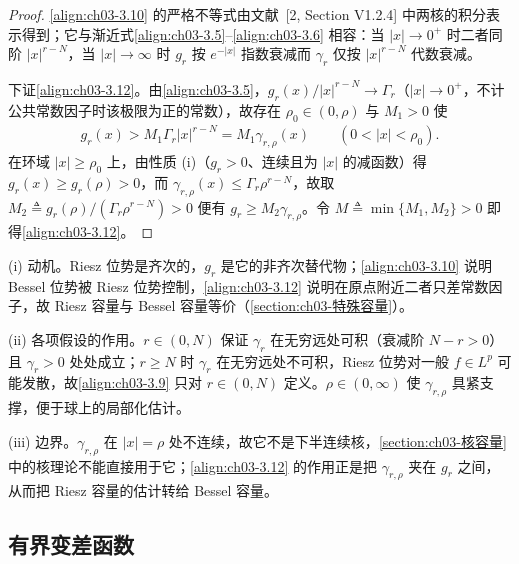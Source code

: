 \documentclass[../../main.tex]{subfiles}%
\begin{document}
\begin{proof}
\eqref{align:ch03-3.10} 的严格不等式由文献~[2, Section V1.2.4] 中两核的积分表示得到；它与渐近式\eqref{align:ch03-3.5}--\eqref{align:ch03-3.6} 相容：当 $|x|\to0^+$ 时二者同阶 $|x|^{r-N}$，当 $|x|\to\infty$ 时 $g_r$ 按 $e^{-|x|}$ 指数衰减而 $\gamma_r$ 仅按 $|x|^{r-N}$ 代数衰减。

下证\eqref{align:ch03-3.12}。由\eqref{align:ch03-3.5}，$g_r(x)/|x|^{r-N}\to\Gamma_r$（$|x|\to0^+$，不计公共常数因子时该极限为正的常数），故存在 $\rho_0\in(0,\rho)$ 与 $M_1>0$ 使
\begin{align*}
g_r(x)>M_1\Gamma_r|x|^{r-N}=M_1\gamma_{r,\rho}(x)\qquad(0<|x|<\rho_0).
\end{align*}
在环域 $|x|\geqslant\rho_0$ 上，由性质 (i)（$g_r>0$、连续且为 $|x|$ 的减函数）得 $g_r(x)\geqslant g_r(\rho)>0$，而 $\gamma_{r,\rho}(x)\leqslant\Gamma_r\rho^{r-N}$，故取 $M_2\triangleq g_r(\rho)/(\Gamma_r\rho^{r-N})>0$ 便有 $g_r\geqslant M_2\gamma_{r,\rho}$。令 $M\triangleq\min\{M_1,M_2\}>0$ 即得\eqref{align:ch03-3.12}。
\end{proof}

\begin{remark}\label{remark:ch03-Riesz核动机}
(i) 动机。Riesz 位势是齐次的，$g_r$ 是它的非齐次替代物；\eqref{align:ch03-3.10} 说明 Bessel 位势被 Riesz 位势控制，\eqref{align:ch03-3.12} 说明在原点附近二者只差常数因子，故 Riesz 容量与 Bessel 容量等价（\cref{section:ch03-特殊容量}）。

(ii) 各项假设的作用。$r\in(0,N)$ 保证 $\gamma_r$ 在无穷远处可积（衰减阶 $N-r>0$）且 $\gamma_r>0$ 处处成立；$r\geqslant N$ 时 $\gamma_r$ 在无穷远处不可积，Riesz 位势对一般 $f\in L^p$ 可能发散，故\eqref{align:ch03-3.9} 只对 $r\in(0,N)$ 定义。$\rho\in(0,\infty)$ 使 $\gamma_{r,\rho}$ 具紧支撑，便于球上的局部化估计。

(iii) 边界。$\gamma_{r,\rho}$ 在 $|x|=\rho$ 处不连续，故它不是下半连续核，\cref{section:ch03-核容量}中的核理论不能直接用于它；\eqref{align:ch03-3.12} 的作用正是把 $\gamma_{r,\rho}$ 夹在 $g_r$ 之间，从而把 Riesz 容量的估计转给 Bessel 容量。
\end{remark}

\subsection{有界变差函数}\label{subsection:ch03-BV}
\end{document}
